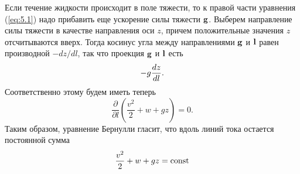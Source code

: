 Если течение жидкости происходит в поле тяжести, то к правой части уравнения
(\ref{eq:5.1}) надо прибавить еще ускорение силы тяжести $\mathbf{g}$. Выберем направление
силы тяжести в качестве направления оси $z$, причем положительные значения $z$
отсчитываются вверх. Тогда косинус угла между направлениями $\mathbf{g}$ и $\mathbf{l}$ равен производной $-dz/dl$, так что проекция $\mathbf{g}$ и $\mathbf{l}$ есть
\[
   -g \frac{d{z}}{d{l}}.
\]
Соответственно этому будем иметь теперь
\[
   \frac{\partial}{\partial l}\left( \frac{v^2}{2} + w + gz\right) = 0.
\]
Таким образом, уравнение Бернулли гласит, что вдоль линий
тока остается постоянной сумма
\begin{equation}
   \label{eq:5.4}
    \frac{v^2}{2} + w + gz = \mathop{\mathrm{const}}\nolimits
\end{equation}

